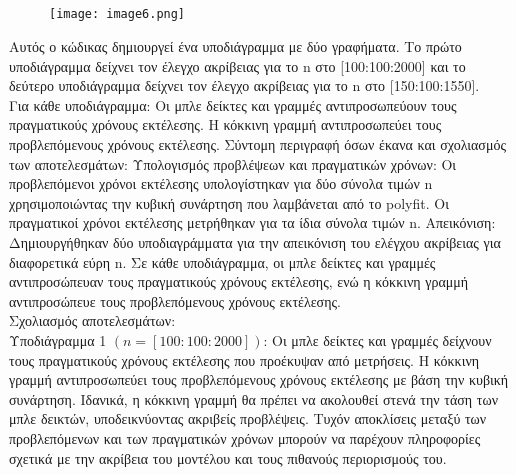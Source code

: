 \documentclass[12pt,a4paper]{article}
\begin{document}
\subsection{}
\begin{figure}[h]
\centering
\texttt{[image: image6.png]} 
\label{fig:image7}
\end{figure}
\FloatBarrier %
Αυτός ο κώδικας δημιουργεί ένα υποδιάγραμμα με δύο γραφήματα. Το πρώτο υποδιάγραμμα δείχνει τον έλεγχο ακρίβειας για το n στο [100:100:2000] και το δεύτερο υποδιάγραμμα δείχνει τον έλεγχο ακρίβειας για το n  στο [150:100:1550].\\

Για κάθε υποδιάγραμμα:
Οι μπλε δείκτες και γραμμές αντιπροσωπεύουν τους πραγματικούς χρόνους εκτέλεσης.
Η κόκκινη γραμμή αντιπροσωπεύει τους προβλεπόμενους χρόνους εκτέλεσης.
Σύντομη περιγραφή όσων έκανα και σχολιασμός των αποτελεσμάτων:
Υπολογισμός προβλέψεων και πραγματικών χρόνων: Οι προβλεπόμενοι χρόνοι εκτέλεσης υπολογίστηκαν για δύο σύνολα τιμών n χρησιμοποιώντας την κυβική συνάρτηση που λαμβάνεται από το polyfit. Οι πραγματικοί χρόνοι εκτέλεσης μετρήθηκαν για τα ίδια σύνολα τιμών n.
Απεικόνιση: Δημιουργήθηκαν δύο υποδιαγράμματα για την απεικόνιση του ελέγχου ακρίβειας για διαφορετικά εύρη n. Σε κάθε υποδιάγραμμα, οι μπλε δείκτες και γραμμές αντιπροσώπευαν τους πραγματικούς χρόνους εκτέλεσης, ενώ η κόκκινη γραμμή αντιπροσώπευε τους προβλεπόμενους χρόνους εκτέλεσης.\\

Σχολιασμός αποτελεσμάτων:\\

Υποδιάγραμμα 1  $(n=[100:100:2000])$:
Οι μπλε δείκτες και γραμμές δείχνουν τους πραγματικούς χρόνους εκτέλεσης που προέκυψαν από μετρήσεις. Η κόκκινη γραμμή αντιπροσωπεύει τους προβλεπόμενους χρόνους εκτέλεσης με βάση την κυβική συνάρτηση. Ιδανικά, η κόκκινη γραμμή θα πρέπει να ακολουθεί στενά την τάση των μπλε δεικτών, υποδεικνύοντας ακριβείς προβλέψεις. Τυχόν αποκλίσεις μεταξύ των προβλεπόμενων και των πραγματικών χρόνων μπορούν να παρέχουν πληροφορίες σχετικά με την ακρίβεια του μοντέλου και τους πιθανούς περιορισμούς του.\\
\end{document}
